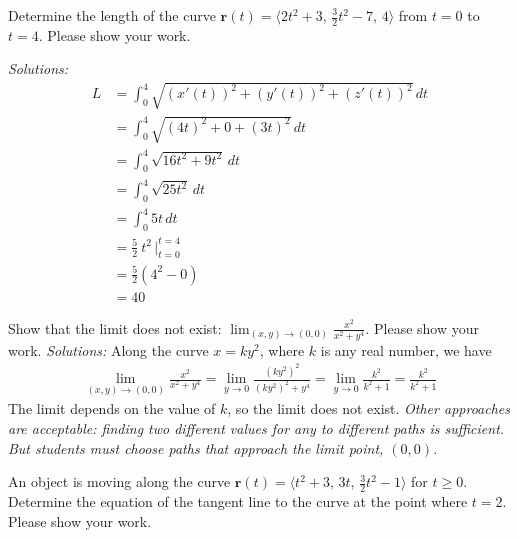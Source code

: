 
\ifnum {}
\question[4] Determine the length of the curve $\mathbf r(t) =  \langle 2t^2+3, \,  \frac32t^2-7 , \, 4 \rangle$ from $t=0$ to $t=4$. Please show your work. 

\ifnum {} {\color{DarkBlue} \textit{Solutions:} 
\begin{align*}
    L &= \int_0^4 \sqrt{(x'(t))^2+(y'(t))^2+(z'(t))^2} \, dt \\
    &= \int_0^4 \sqrt{(4t)^2 + 0 + (3t)^2} \, dt \\
    &= \int_0^4 \sqrt{16t^2 + 9t^2} \, dt \\
    &= \int_0^4 \sqrt{25t^2} \, dt \\
    &= \int_0^4 5t \, dt \\
    &= \frac52 \ t^2 \, \big|_{t=0}^{t=4} \\
    &= \frac52 (4^2 - 0) \\
    &= 40
\end{align*}
}
\else
\vspace{9cm}
\fi
\fi


\ifnum {}

\question[4] Show that the limit does not exist: $\displaystyle \lim_{(x,y) \rightarrow (0,0)} \frac{x^2}{x^2 + y^4}$.  Please show your work. 
\ifnum {} {\color{DarkBlue}  \textit{Solutions:} Along the curve $x = ky^2$, where $k$ is any real number, we have
    \begin{align*}
        \lim_{(x,y) \rightarrow (0,0)} \frac{x^2}{x^2 + y^4} = 
        \lim_{y \rightarrow 0} \frac{(ky^2)^2}{(ky^2)^2 + y^4}  
        = \lim_{y \rightarrow 0} \frac{k^2}{k^2 + 1}   
        =  \frac{k^2}{k^2 + 1}
    \end{align*}
    The limit depends on the value of $k$, so the limit does not exist. 
    \textit{Other approaches are acceptable: finding two different values for any to different paths is sufficient. But students must choose paths that approach the limit point, $(0,0)$.  }
    } 
   \else
      \vspace{5cm}
   \fi
    
\fi



\ifnum {}
\question[4] An object is moving along the curve $\mathbf r(t) =  \langle t^2+3, \, 3t, \, \frac32t^2-1 \rangle$ for $t\ge 0$. Determine the equation of the tangent line to the curve at the point where $t=2$. Please show your work. 

